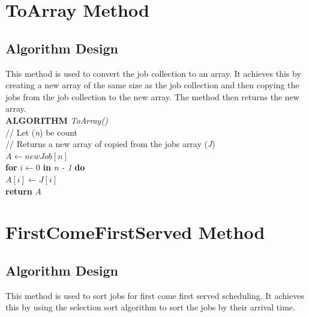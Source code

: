 \documentclass[12pt,a4paper]{article}
\begin{document}
	\newpage
			
	\section{ToArray Method}
		\subsection{Algorithm Design}
			This method is used to convert the job collection to an array. It achieves this by creating a 
			new array of the same size as the job collection and then copying the jobs from the job 
			collection to the new array. The method then returns the new array.\\

			\textbf{ALGORITHM} \textit{ToArray()}\\
			\null\hspace{1cm}// Let (\textit{n}) be count\\
			\null\hspace{1cm}// Returns a new array of copied from the jobs array (\textit{J})\\
			\null\hspace{1cm}\textit{$A \gets new Job[n]$}\\
			\null\hspace{1cm}\textbf{for} \textit{$i \gets 0$} \textbf{in} \textit{n - 1} \textbf{do}\\
			\null\hspace{2cm}\textit{$A[i] \gets J[i]$}\\
			\null\hspace{1cm}\textbf{return} \textit{A}\\
				
	
	\section{FirstComeFirstServed Method}
		\subsection{Algorithm Design}
			This method is used to sort jobs for first come first served scheduling. It achieves 
			this by using the selection sort algorithm to sort the jobs by their arrival time.\\
\end{document}
